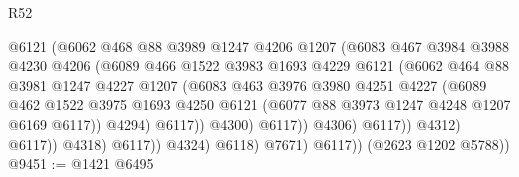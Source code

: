 \begin{lexlean}{R52}
\begin{coremodule}
                                    @6121
                                    (@6062
                                      @468
                                      @88
                                      @3989
                                      @1247
                                      @4206
                                      @1207
                                      (@6083
                                        @467
                                        @3984
                                        @3988
                                        @4230
                                        @4206
                                        (@6089
                                          @466
                                          @1522
                                          @3983
                                          @1693
                                          @4229
                                          @6121
                                          (@6062
                                            @464
                                            @88
                                            @3981
                                            @1247
                                            @4227
                                            @1207
                                            (@6083
                                              @463
                                              @3976
                                              @3980
                                              @4251
                                              @4227
                                              (@6089
                                                @462
                                                @1522
                                                @3975
                                                @1693
                                                @4250
                                                @6121
                                                (@6077 @88 @3973 @1247 @4248 @1207 @6169 @6117))
                                              @4294)
                                            @6117))
                                        @4300)
                                      @6117))
                                  @4306)
                                @6117))
                            @4312)
                          @6117))
                      @4318)
                    @6117))
                @4324)
              @6118)
            @7671)
          @6117))
      (@2623 @1202 @5788))
@9451 := @1421 @6495

\end{coremodule}
\end{lexlean}
